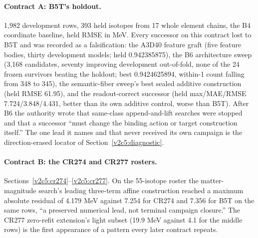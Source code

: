 \paragraph{Contract A: B5T's holdout.} 1,982 development rows, 393 held isotopes from 17 whole element chains, the B4 coordinate baseline, held RMSE in MeV. Every successor on this contract lost to B5T and was recorded as a falsification: the A3D40 feature graft (five feature bodies, thirty development models; held 0.942385875), the B6 architecture sweep (3,168 candidates, seventy improving development out-of-fold, none of the 24 frozen survivors beating the holdout; best 0.9424625894, within-1 count falling from 348 to 345), the semantic-fiber sweep's best sealed additive construction (held RMSE 61.95), and the readout-correct successor (held max/MAE/RMSE 7.724/3.848/4.431, better than its own additive control, worse than B5T). After B6 the authority wrote that same-class append-and-lift searches were stopped and that a successor ``must change the binding action or target construction itself.''\cite{viibindinglive} The one lead it names and that never received its own campaign is the direction-erased locator of Section~\ref{v2c5:diagnostic}.

\paragraph{Contract B: the CR274 and CR277 rosters.} Sections~\ref{v2c5:cr274}--\ref{v2c5:cr277}. On the 55-isotope roster the matter-magnitude search's leading three-term affine construction reached a maximum absolute residual of 4.179 MeV against 7.254 for CR274 and 7.356 for B5T on the same rows, ``a preserved numerical lead, not terminal campaign closure.'' The CR277 zero-refit extension's light subset (19.9 MeV against 4.1 for the middle rows) is the first appearance of a pattern every later contract repeats.

